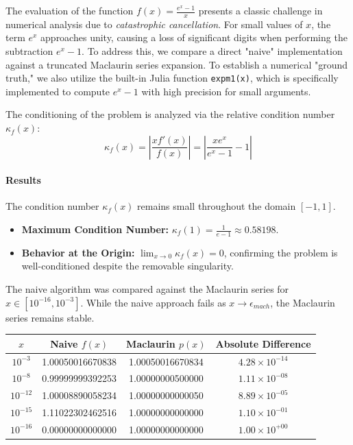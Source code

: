 \begin{solution}
  The evaluation of the function $f(x) = \frac{e^x - 1}{x}$ presents a classic challenge in numerical analysis due to \textit{catastrophic cancellation}. For small values of $x$, the term $e^x$ approaches unity, causing a loss of significant digits when performing the subtraction $e^x - 1$. To address this, we compare a direct "naive" implementation against a truncated Maclaurin series expansion. To establish a numerical "ground truth," we also utilize the built-in Julia function \texttt{expm1(x)}, which is specifically implemented to compute $e^x - 1$ with high precision for small arguments.

  The conditioning of the problem is analyzed via the relative condition number $\kappa_f(x)$:
  \[
      \kappa_f(x) = \left| \frac{x f'(x)}{f(x)} \right| = \left| \frac{x e^x}{e^x - 1} - 1 \right|
  \]

  \paragraph{Results}
  The condition number $\kappa_f(x)$ remains small throughout the domain $[-1, 1]$.
  \begin{itemize}
      \item \textbf{Maximum Condition Number:} $\kappa_f(1) = \frac{1}{e-1} \approx 0.58198$.
      \item \textbf{Behavior at the Origin:} $\lim_{x \to 0} \kappa_f(x) = 0$, confirming the problem is well-conditioned despite the removable singularity.
  \end{itemize}

  The naive algorithm was compared against the Maclaurin series for $x \in [10^{-16}, 10^{-3}]$. While the naive approach fails as $x \to \epsilon_{mach}$, the Maclaurin series remains stable.

  \begin{center}
    \centering
    \begin{tabular}{cccc}
      \hline
      $x$ & \textbf{Naive} $f(x)$ & \textbf{Maclaurin} $p(x)$ & \textbf{Absolute Difference} \\ 
      \hline
      $10^{-3}$  & 1.00050016670838 & 1.00050016670834 & $4.28 \times 10^{-14}$ \\
      $10^{-8}$  & 0.99999999392253 & 1.00000000500000 & $1.11 \times 10^{-08}$ \\
      $10^{-12}$ & 1.00008890058234 & 1.00000000000050 & $8.89 \times 10^{-05}$ \\
      $10^{-15}$ & 1.11022302462516 & 1.00000000000000 & $1.10 \times 10^{-01}$ \\
      $10^{-16}$ & 0.00000000000000 & 1.00000000000000 & $1.00 \times 10^{+00}$ \\ 
      \hline
    \end{tabular}
  \end{center}


\end{solution}
